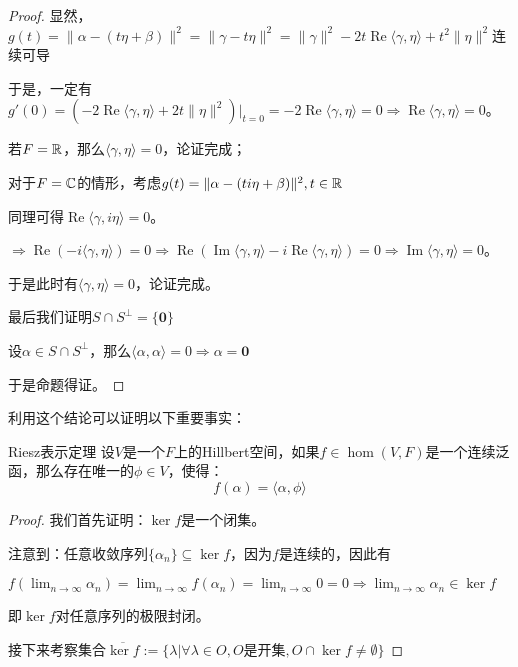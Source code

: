 \documentclass[12pt, a4paper, oneside, UTF8]{ctexbook}
\begin{document}
\begin{para}{0}
\begin{proof}
						显然，$g(t)=\|\alpha - (t\eta + \beta )\|^2=\|\gamma - t\eta \|^2=\|\gamma \|^2-2t\operatorname{Re}\langle \gamma ,\eta  \rangle+t^2\|\eta \|^2$连续可导

						于是，一定有$g'(0)=(-2\operatorname{Re}\langle \gamma ,\eta  \rangle+2t\|\eta \|^2)|_{t=0}=-2\operatorname{Re}\langle \gamma ,\eta  \rangle=0\Rightarrow \operatorname{Re}\langle \gamma ,\eta  \rangle=0$。

						若$F=\mathbb{R}$，那么$\langle \gamma ,\eta  \rangle=0$，论证完成；
						
						对于$F=\mathbb{C}$的情形，考虑$g(t)=\|\alpha - (t i \eta + \beta )\|^2,t \in \mathbb{R}$

						同理可得$\operatorname{Re}\langle \gamma ,i\eta  \rangle=0$。

						$\Rightarrow \operatorname{Re}(-i\langle \gamma ,\eta  \rangle)=0 \Rightarrow \operatorname{Re}(\operatorname{Im}\langle \gamma ,\eta  \rangle-i\operatorname{Re}\langle \gamma ,\eta  \rangle)=0\Rightarrow \operatorname{Im}\langle \gamma ,\eta  \rangle=0$。
					
						于是此时有$\langle \gamma ,\eta  \rangle=0$，论证完成。

						最后我们证明$S \cap S^{\perp}=\{\mathbf{0}\}$

						设$\alpha \in S\cap S^{\perp}$，那么$\langle \alpha ,\alpha \rangle = 0 \Rightarrow \alpha = \mathbf{0}$

						于是命题得证。
					\end{proof}
					利用这个结论可以证明以下重要事实：
					\begin{them}{Riesz表示定理}{}
						设$V$是一个$F$上的Hillbert空间，如果$f \in \hom(V,F)$是一个连续泛函，那么存在唯一的$\phi \in V$，使得：
						\begin{equation}
							f(\alpha ) = \langle \alpha,\phi  \rangle
						\end{equation}
					\end{them}
					\begin{proof}
							我们首先证明：$\ker f$是一个闭集。

							注意到：任意收敛序列$\{\alpha_n\} \subseteq \ker f$，因为$f$是连续的，因此有

							$f(\lim_{n \to \infty} \alpha_n)=\lim_{n \to \infty} f(\alpha_n)=\lim_{n \to \infty} 0=0 \Rightarrow \lim_{n \to \infty} \alpha_n \in \ker f$

							即$\ker f$对任意序列的极限封闭。

							接下来考察集合$\overline{\ker f}:=\{\lambda | \forall \lambda \in O,O\text{是开集},O \cap \ker f \neq \emptyset\}$


\end{proof}
\end{para}
\end{document}
